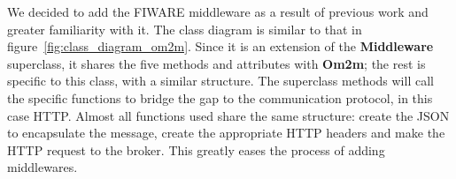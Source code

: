 \documentclass[conference]{IEEEtran}
\begin{document}
We decided to add the FIWARE middleware as a result of previous work and greater familiarity with it. The class diagram is similar to that in figure~\ref{fig:class_diagram_om2m}. Since it is an extension of the \textbf{Middleware} superclass, it shares the five methods and attributes with \textbf{Om2m}; the rest is specific to this class, with a similar structure. The superclass methods will call the specific functions to bridge the gap to the communication protocol, in this case HTTP\@.
% 
% 
% 
% 
Almost all functions used share the same structure: create the JSON to encapsulate the message, create the appropriate HTTP headers and make the HTTP request to the broker. This greatly eases the process of adding middlewares.
\end{document}
